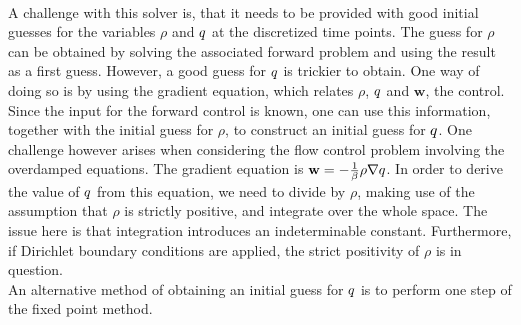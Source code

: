 \\
A challenge with this solver is, that it needs to be provided with good initial guesses for the variables $\rho$ and $q$ at the discretized time points. The guess for $\rho$ can be obtained by solving the associated forward problem and using the result as a first guess. However, a good guess for $q$ is trickier to obtain. One way of doing so is by using the gradient equation, which relates $\rho$, $q$ and $\mathbf w$, the control. Since the input for the forward control is known, one can use this information, together with the initial guess for $\rho$, to construct an initial guess for $q$. 
One challenge however arises when considering the flow control problem involving the overdamped equations. The gradient equation is $\mathbf{w} = - \frac{1}{\beta} \rho\nabla q$. In order to derive the value of $q$ from this equation, we need to divide by $\rho$, making use of the assumption that $\rho$ is strictly positive, and integrate over the whole space. The issue here is that integration introduces an indeterminable constant. Furthermore, if Dirichlet boundary conditions are applied, the strict positivity of $\rho$ is in question.\\
An alternative method of obtaining an initial guess for $q$ is to perform one step of the fixed point method.
